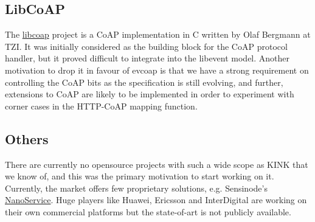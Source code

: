 \subsection{LibCoAP}
The \href{http://sourceforge.net/projects/libcoap}{libcoap} project is a CoAP implementation in C written by Olaf Bergmann at TZI.
It was initially considered as the building block for the CoAP protocol handler, but it proved difficult to integrate into the libevent model.  Another motivation to drop it in favour of evcoap is that we have a strong requirement on controlling the CoAP bits as the specification is still evolving, and further, extensions to CoAP are likely to be implemented in order to experiment with corner cases in the HTTP-CoAP mapping function.

\subsection{Others}
There are currently no opensource projects with such a wide scope as KINK that we know of, and this was the primary motivation to start working on it.
Currently, the market offers few proprietary solutions, e.g. Sensinode's \href{http://www.sensinode.com/EN/products/nanoservice.html}{NanoService}.  Huge players like Huawei, Ericsson and InterDigital are working on their own commercial platforms but the state-of-art is not publicly available.
